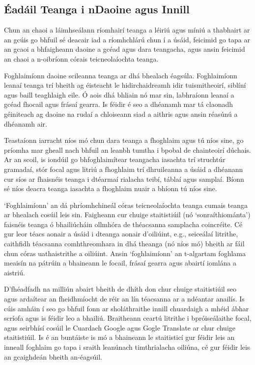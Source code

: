\begin{multicols}{2}

\subsection{Éadáil Teanga i nDaoine agus Innill}

Chun an chaoi a láimhseálann ríomhairí teanga a léiriú agus míniú a thabhairt ar an gcúis go bhfuil sé deacair iad a ríomhchlárú chun í a úsáid, feicimid go tapa ar an gcaoi a bhfaigheann daoine a gcéad agus dara teangacha, agus ansin feicimid an chaoi a n-oibríonn córais teicneolaíochta teanga.



Foghlaimíonn daoine scileanna teanga ar dhá bhealach éagsúla. Foghlaimíonn leanaí teanga trí bheith ag éisteacht le hidirchaidreamh idir tuismitheoirí, siblíní agus baill teaghlaigh eile. Ó aois dhá bhliain nó mar sin, labhraíonn leanaí a gcéad fhocail agus frásaí gearra. Is féidir é seo a dhéanamh mar tá claonadh géiniteach ag daoine na rudaí a chloiseann siad a aithris agus ansin réasúnú a dhéanamh air. 

Teastaíonn iarracht níos mó chun dara teanga a fhoghlaim agus tú níos sine, go príomha mar gheall nach bhfuil an leanbh tumtha i bpobal de chainteoirí dúchais. Ar an scoil, is iondúil go bhfoghlaimítear teangacha iasachta trí struchtúr gramadaí, stór focal agus litriú a fhoghlaim trí dhruileanna a úsáid a dhéanann cur síos ar fhaisnéis teanga i dtéarmaí rialacha teibí, táblaí agus samplaí. Bíonn sé níos deacra teanga iasachta a fhoghlaim nuair a bhíonn tú níos sine. 

`Foghlaimíonn' an dá phríomhchineál córas teicneolaíochta teanga cumais teanga ar bhealach cosúil leis sin. Faigheann cur chuige staitistiúil (nó ‘sonraíthiománta’) faisnéis teanga ó bhailiúcháin ollmhóra de théacsanna samplacha coincréite. Cé gur leor téacs aonair a úsáid i dteanga aonair d'oiliúint, e.g., seiceálaí litrithe, caithfidh téacsanna comhthreomhara in dhá theanga (nó níos mó) bheith ar fáil chun córas uathaistrithe a oiliúint. Ansin `foghlaimíonn' an t-algartam foghlama meaisín na pátrúin a bhaineann le focail, frásaí gearra agus abairtí iomlána a aistriú. 

D’fhéadfadh na milliún abairt bheith de dhíth don chur chuige staitistiúil seo agus ardaítear an fheidhmíocht de réir an lín téacsanna ar a ndéantar anailís. Is cúis amháin í seo go bhfuil fonn ar sholáthraithe innill chuardaigh a mhéid ábhar scríofa agus is féidir leo a bhailiú. Braitheann ceartú litrithe i bpróiseálaithe focal, agus seirbhísí cosúil le Cuardach Google agus Gogle Translate ar chur chuige staitistiúil. Is é an buntáiste is mó a bhaineann le staitisticí gur féidir leis an inneall foghlaim go tapa i sraith leanúnach timthrialacha oiliúna, cé gur féidir leis an gcaighdeán bheith an-éagsúil.


\end{multicols}
